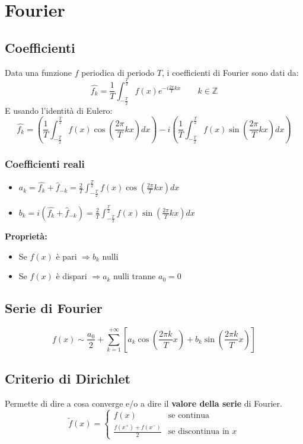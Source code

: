 \documentclass[10pt, a4paper]{article}
\begin{document}
\section{Fourier}
    \subsection{Coefficienti}
        Data una funzione $f$ periodica di periodo $T$, i coefficienti di Fourier sono dati da:
        \begin{equation*}
            \hat{f_k}=\frac{1}{T}\int_{-\frac{T}{2}}^{\frac{T}{2}}f(x)e^{-i\frac{2\pi}{T}kx} \qquad k\in\mathbb{Z}
        \end{equation*}
        E usando l'identità di Eulero:
        \begin{equation*}
            \hat{f_k}=\left(\frac{1}{T}\int_{-\frac{T}{2}}^{\frac{T}{2}}f(x)\cos\left(\frac{2\pi}{T}kx\right)dx\right)-i\left(\frac{1}{T}\int_{-\frac{T}{2}}^{\frac{T}{2}}f(x)\sin\left(\frac{2\pi}{T}kx\right)dx\right)
        \end{equation*}
        \subsubsection{Coefficienti reali}
        \begin{itemize}
            \item $a_k=\hat{f_k}+\hat{f}_{-k}=\frac{2}{T}\int_{-\frac{T}{2}}^{\frac{T}{2}}f(x)\cos\left(\frac{2\pi}{T}kx\right)dx$
            \item $b_k=i(\hat{f_k}+\hat{f}_{-k})=\frac{2}{T}\int_{-\frac{T}{2}}^{\frac{T}{2}}f(x)\sin\left(\frac{2\pi}{T}kx\right)dx$
        \end{itemize}
        \textbf{Proprietà:} \begin{itemize}
            \item Se $f(x)$ è pari $\Rightarrow b_k$ nulli
            \item Se $f(x)$ è dispari $\Rightarrow a_k$ nulli tranne $a_0=0$
        \end{itemize}
    \subsection{Serie di Fourier}
        \begin{equation*}
            f(x)\sim \frac{a_0}{2}+\sum_{k=1}^{+\infty}\left[a_k\cos\left(\frac{2\pi k}{T}x\right)+b_k\sin\left(\frac{2\pi k}{T}x\right)\right]
        \end{equation*}
    \subsection{Criterio di Dirichlet}
        Permette di dire a cosa converge e/o a dire il \textbf{valore della serie} di Fourier.
        $$
        \tilde{f}(x)=\begin{cases}
            f(x) & \text{se continua}\\
            \frac{f(x^+)+f(x^-)}{2} & \text{se discontinua in } x
        \end{cases}
        $$
\end{document}
